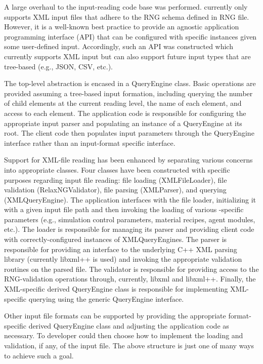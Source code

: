 A large overhaul to the input-reading code base was performed. \Cyclus currently
only supports XML input files that adhere to the RNG schema defined in \Cyclus
RNG file. However, it is a well-known best practice to provide an agnostic
application programming interface (API) that can be configured with specific
instances given some user-defined input. Accordingly, such an API was
constructed which currently supports XML input but can also support future input
types that are tree-based (e.g., JSON, CSV, etc.).

The top-level abstraction is encased in a QueryEngine class. Basic operations
are provided assuming a tree-based input formation, including querying the
number of child elements at the current reading level, the name of each element,
and access to each element. The application code is responsible for configuring
the appropriate input parser and populating an instance of a QueryEngine at its
root. The client code then populates input parameters through the QueryEngine
interface rather than an input-format specific interface.

Support for XML-file reading has been enhanced by separating various concerns
into appropriate classes. Four classes have been constructed with specific
purposes regarding input file reading: file loading (XMLFileLoader), file
validation (RelaxNGValidator), file parsing (XMLParser), and querying
(XMLQueryEngine). The application interfaces with the file loader, initializing
it with a given input file path and then invoking the loading of various
\Cyclus-specific parameters (e.g., simulation control parameters, material
recipes, agent modules, etc.). The loader is responsible for managing its parser
and providing client code with correctly-configured instances of
XMLQueryEngines. The parser is responsible for providing an interface to the
underlying C++ XML parsing library (currently libxml++ is used) and invoking the
appropriate validation routines on the parsed file. The validator is responsible
for providing access to the RNG-validation operations through, currently, libxml
and libxml++. Finally, the XML-specific derived QueryEngine class is responsible
for implementing XML-specific querying using the generic QueryEngine interface.

Other input file formats can be supported by providing the appropriate
format-specific derived QueryEngine class and adjusting the application code as
necessary. To developer could then choose how to implement the loading and
validation, if any, of the input file. The above structure is just one of many
ways to achieve such a goal.

